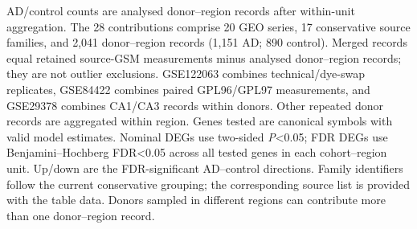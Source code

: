 \fontsize{7.6}{9.6}\selectfont
AD/control counts are analysed donor--region records after within-unit aggregation. The 28 contributions comprise 20 GEO series, 17 conservative source families, and 2,041 donor--region records (1,151 AD; 890 control). 
Merged records equal retained source-GSM measurements minus analysed donor--region records; they are not outlier exclusions. GSE122063 combines technical/dye-swap replicates, GSE84422 combines paired GPL96/GPL97 measurements, and GSE29378 combines CA1/CA3 records within donors. 
Other repeated donor records are aggregated within region. Genes tested are canonical symbols with valid model estimates. Nominal DEGs use two-sided \textit{P}<0.05; FDR DEGs use Benjamini--Hochberg FDR<0.05 across all tested genes in each cohort--region unit. Up/down are the FDR-significant AD--control directions. 
Family identifiers follow the current conservative grouping; the corresponding source list is provided with the table data. Donors sampled in different regions can contribute more than one donor--region record.